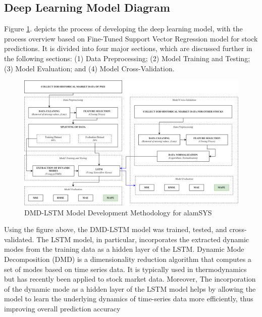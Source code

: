 \subsection{Deep Learning Model Diagram}
\label{subsec:ml_diagram}
Figure \ref{fig:ml_model}. depicts the process of developing the deep learning model, with the process 
overview based on  Fine-Tuned Support Vector Regression model for stock 
predictions. It is divided into four major sections, which are discussed further in the following 
sections: (1) Data Preprocessing; (2) Model Training and Testing; (3) Model Evaluation; and (4) 
Model Cross-Validation.

\begin{figure}[ht]
    \centering
    \includegraphics[width=1\textwidth]{./assets/Chapter_3/Machine Learning Model.png}
    \caption{DMD-LSTM Model Development Methodology for alamSYS}
    \label{fig:ml_model}
\end{figure}
\FloatBarrier

Using the figure above, the DMD-LSTM model was trained, tested, 
and cross-validated. The LSTM model, in particular, incorporates 
the extracted dynamic modes from the training data as a hidden layer 
of the LSTM. Dynamic Mode Decomposition (DMD) is a dimensionality 
reduction algorithm that computes a set of modes based on time 
series data. It is typically used in thermodynamics but has recently 
been applied to stock market data. Moreover, The incorporation of the dynamic 
mode as a hidden layer of the LSTM model helps by allowing the 
model to learn the underlying dynamics of time-series data more efficiently, 
thus improving overall prediction accuracy \cite{2020arXiv200502762E}

